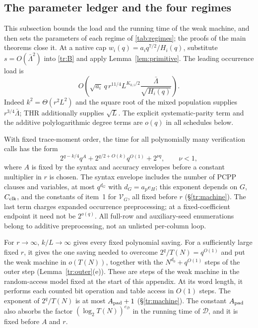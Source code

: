 \documentclass[11pt,letterpaper]{article}
\theoremstyle{definition}
\theoremstyle{remark}
\begin{document}
\subsection{The parameter ledger and the four regimes}
\label{tr:parameters}

This subsection bounds the load and the running time of the weak
machine, and then sets the parameters of each regime of
\cref{tab:regimes}; the proofs of the main theorems close it.
At a native cap $w_i(q)=a_iq^{7/2}/H_i(q)$, substitute
$s=O(\bar\Lambda^2)$ into \eqref{tr:B} and apply
Lemma~\ref{lem:primitive}. The leading occurrence load is
\begin{equation}
 O\left(\sqrt{a_i}\,q\,r^{11/4}L^{K_{0,i}/2}
                   \frac{\bar\Lambda}{\sqrt{H_i(q)}}\right).
 \label{tr:load}
\end{equation}
Indeed $k^2=\Theta(r^2L^2)$ and the square root of the mixed
population supplies $r^{3/4}\bar\Lambda$; THR additionally supplies
$\sqrt L$. The explicit systematic-parity term and the additive
polylogarithmic degree terms are $o(q)$ in all schedules below.

With fixed trace-moment order, the time for all polynomially many
verification calls has the form
\begin{equation}
 2^{q-k/4}q^A+2^{q/2+O(k)}q^{O(1)}+2^{\nu q},\qquad \nu<1,
 \label{tr:time}
\end{equation}
where $A$ is fixed by the syntax and accuracy envelopes before a
constant multiplier in $r$ is chosen. The syntax envelope includes the
number of PCPP clauses and variables, at most $q^{d_G}$ with
$d_G=a_pe_H$; this exponent depends on $G$, $C_{\rm clk}$, and the
constants of item~1 for $\mathcal V_G$, all fixed before $r$
(\S\ref{tr:machine}). The last term charges expanded
occurrence preprocessing; at a fixed-coefficient endpoint it need not
be $2^{o(q)}$. All full-row and auxiliary-seed enumerations belong
to additive preprocessing, not an unlisted per-column loop.

For $r\to\infty$, $k/L\to\infty$ gives every fixed polynomial
saving. For a sufficiently large fixed $r$, it gives the one saving
needed to overcome $2^q/T(N)=q^{O(1)}$ and put the weak machine in
$o(T(N))$, together with the $N^{d_0}+q^{O(1)}$ steps of the outer step
(Lemma~\ref{tr:outer}(e)). These are steps of the weak machine in the
random-access model fixed at the start of this appendix. At its word
length, it performs each counted bit operation and table access in
$O(1)$ steps. The exponent of $2^q/T(N)$ is at most $A_{\rm pad}+1$
(\S\ref{tr:machine}). The constant $A_{\rm pad}$ also absorbs the factor
$(\log_2T(N))^{e_{\mathcal D}}$ in the running time of $\mathcal D$,
and it is fixed before $A$ and $r$.
\end{document}
